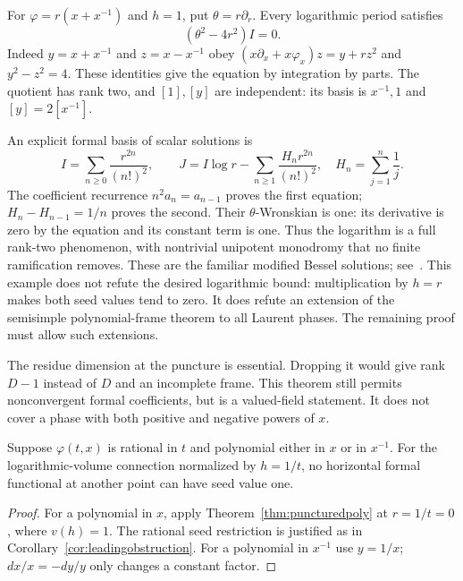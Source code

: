 \begin{remark}
For $\varphi=r(x+x^{-1})$ and $h=1$, put $\theta=r\partial_r$.
Every logarithmic period satisfies
\[
 (\theta^2-4r^2)I=0.
\]
Indeed $y=x+x^{-1}$ and $z=x-x^{-1}$ obey
$(x\partial_x+x\varphi_x)z=y+rz^2$ and $y^2-z^2=4$.
These identities give the equation by integration by parts.
The quotient has rank two, and $[1],[y]$ are independent:
its basis is $x^{-1},1$ and $[y]=2[x^{-1}]$.

An explicit formal basis of scalar solutions is
\[
 I=\sum_{n\geq0}\frac{r^{2n}}{(n!)^2},\qquad
 J=I\log r-\sum_{n\geq1}\frac{H_n r^{2n}}{(n!)^2},
 \quad H_n=\sum_{j=1}^n\frac1j.
\]
The coefficient recurrence $n^2a_n=a_{n-1}$ proves the first
equation; $H_n-H_{n-1}=1/n$ proves the second.
Their $\theta$-Wronskian is one: its derivative is zero by the
equation and its constant term is one. Thus the logarithm is a full
rank-two phenomenon, with nontrivial unipotent monodromy that no
finite ramification removes. These are the familiar modified Bessel
solutions; see~\cite[10.25.1, 10.31.2]{DLMF}.
This example does not refute the desired logarithmic bound:
multiplication by $h=r$ makes both seed values tend to zero.
It does refute an extension of the semisimple polynomial-frame theorem
to all Laurent phases. The remaining proof must allow such extensions.
\end{remark}

The residue dimension at the puncture is essential. Dropping it would
give rank $D-1$ instead of $D$ and an incomplete frame. This theorem
still permits nonconvergent formal coefficients, but is a valued-field
statement. It does not cover a phase with both positive and negative
powers of $x$.

\begin{corollary}\label{cor:oneend}
Suppose $\varphi(t,x)$ is rational in $t$ and polynomial either in
$x$ or in $x^{-1}$. For the logarithmic-volume connection normalized
by $h=1/t$, no horizontal formal functional at another point can have
seed value one.
\end{corollary}
\begin{proof}
For a polynomial in $x$, apply Theorem~\ref{thm:puncturedpoly} at
$r=1/t=0$, where $v(h)=1$. The rational seed restriction is justified
as in Corollary~\ref{cor:leadingobstruction}. For a polynomial in
$x^{-1}$ use $y=1/x$; $dx/x=-dy/y$ only changes a constant factor.
\end{proof}
